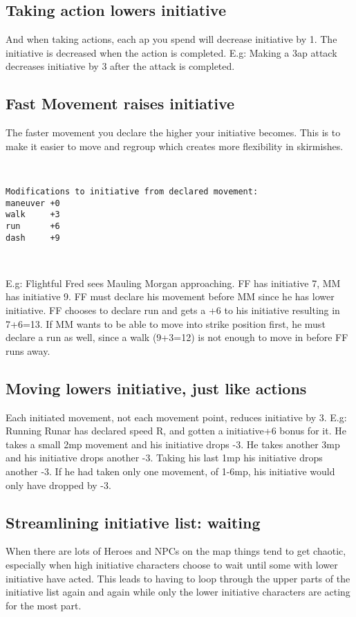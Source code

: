 \subsection*{Taking action lowers initiative}
And when taking actions, each ap you spend will decrease initiative by 1. The initiative is decreased when the action is completed.
E.g: Making a 3ap attack decreases initiative by 3 after the attack is completed.


\subsection*{Fast Movement raises initiative}
The faster movement you declare the higher your initiative becomes. This is to make it easier to move and regroup which creates more flexibility in skirmishes.

\

\begin{verbatim}
Modifications to initiative from declared movement:
maneuver +0
walk     +3
run      +6
dash     +9
\end{verbatim}

\

E.g: Flightful Fred sees Mauling Morgan approaching. FF has initiative 7, MM has initiative 9. FF must declare his movement before MM since he has lower initiative. FF chooses to declare run and gets a +6 to his initiative resulting in 7+6=13. If MM wants to be able to move into strike position first, he must declare a run as well, since a walk (9+3=12) is not enough to move in before FF runs away.


\subsection*{Moving lowers initiative, just like actions}
\label{sec:movinglowersinitiative}
Each initiated movement, not each movement point, reduces initiative by 3. E.g: Running Runar has declared speed R, and gotten a initiative+6 bonus for it. He takes a small 2mp movement and his initiative drops -3. He takes another 3mp and his initiative drops another -3. Taking his last 1mp his initiative drops another -3. If he had taken only one movement, of 1-6mp, his initiative would only have dropped by -3.


\subsection*{Streamlining initiative list: waiting}
When there are lots of Heroes and NPCs on the map things tend to get chaotic, especially when high initiative characters choose to wait until some with lower initiative have acted. This leads to having to loop through the upper parts of the initiative list again and again while only the lower initiative characters are acting for the most part.

